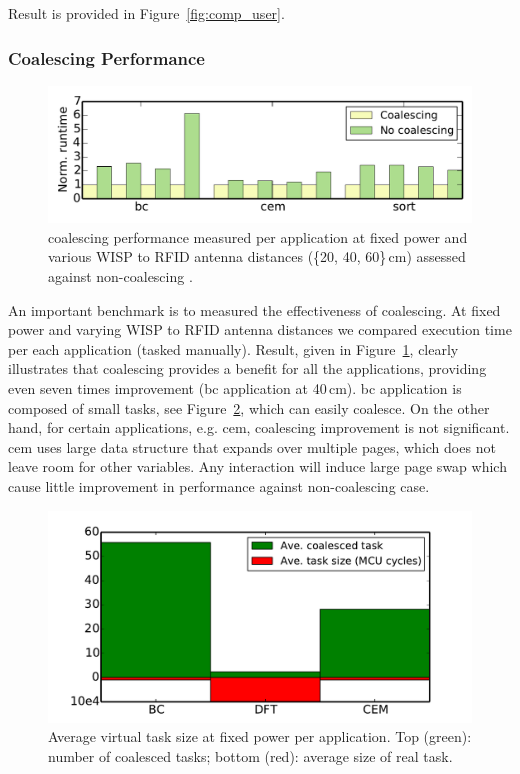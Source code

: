 Result is provided in Figure~\ref{fig:comp_user}.

\subsubsection{\sys Coalescing Performance}
\label{sec:result_compiler_time}

\begin{figure}
	\centering
	\includegraphics[width=\columnwidth]{figures/coalescing}
	\caption{\sys coalescing performance measured per application at fixed power and various WISP to RFID antenna distances (\{20, 40, 60\}\,cm) assessed against non-coalescing \sys.}
	\label{fig:coalescing}
\end{figure}

An important benchmark is to measured the effectiveness of \sys coalescing. At fixed power and varying WISP to RFID antenna distances we compared \sys execution time per each application (tasked manually). Result, given in Figure~\ref{fig:coalescing}, clearly illustrates that coalescing provides a benefit for all the applications, providing even seven times improvement (bc application at 40\,cm). bc application is composed of small tasks, see Figure~\ref{fig:aveVirtuTaskSize}, which \sys can easily coalesce. On the other hand, for certain applications, e.g. cem, coalescing improvement is not significant. cem uses large data structure that expands over multiple pages, which does not leave room for other variables. Any interaction will induce large page swap which cause little improvement in \sys performance against non-coalescing case. 

\begin{figure}
	\centering
	\includegraphics[width=\columnwidth]{figures/averageVirtualTaskSize}
	\caption{Average \sys virtual task size at fixed power per application. Top (green): number of coalesced tasks; bottom (red): average size of real task.}
	\label{fig:aveVirtuTaskSize}
\end{figure}

